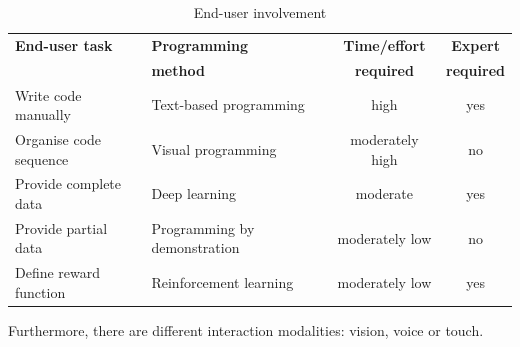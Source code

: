 \begin{table}[ht]
	\centering
	\label{tab:end-user involvement}
	\begin{tabular}{llcc}
		\textbf{End-user task} & \textbf{Programming}   & \textbf{Time/effort} & \textbf{Expert} \\
		\textbf{}& \textbf{method}   & \textbf{ required} & \textbf{ required} \\ \hline
		Write code manually    & Text-based programming       & high                          & yes                      \\
		Organise code sequence & Visual programming           & moderately high               & no                       \\
		Provide complete data  & Deep learning                & moderate                      & yes                      \\
		Provide partial data   & Programming by demonstration & moderately low                & no                       \\
		Define reward function & Reinforcement learning       & moderately low                & yes                     
	\end{tabular}
\caption{End-user involvement}
\end{table}

Furthermore, there are different interaction modalities: vision, voice or touch.

